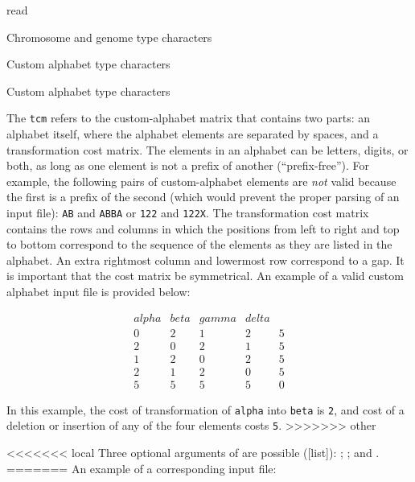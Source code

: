 \begin{command}{read}{}
\begin{arguments}
\begin{argumentgroup}{Chromosome and genome type characters}
\begin{argumentgroup}{Custom alphabet type characters}
\begin{argumentgroup}{Custom alphabet type characters}
{{                \indent The \texttt{tcm} refers to the custom-alphabet matrix
                that contains two parts: an alphabet itself, where the alphabet
                elements are separated by spaces, and a transformation cost
                matrix. The elements in an alphabet can be letters, digits, or
                both, as long as one element is not a prefix of another
                (``prefix-free''). For example, the following pairs of
                custom-alphabet elements are \emph{not} valid because the first
                is a prefix of the second (which would prevent the proper
                parsing of an input file): \texttt{AB} and \texttt{ABBA} or
                \texttt{122} and \texttt{122X}.  The transformation cost matrix
                contains the rows and columns in which the positions from left
                to right and top to bottom correspond to the sequence of the
                elements as they are listed in the alphabet. An extra rightmost
                column and lowermost row correspond to a gap. It is important
                that the cost matrix  be symmetrical. An example of a valid
                custom alphabet input file is provided below:
             
                \begin{equation*}
                    \begin{array}{lllll}
                          alpha & beta & gamma & delta & \\
                        0 &     2 &    1 &     2 &     5 \\
                        2 &     0 &    2 &     1 &     5 \\
                        1 &     2 &    0 &     2 &     5 \\
                        2 &     1 &    2 &     0 &     5 \\
                        5 &     5 &    5 &     5 &     0
                     \end{array}
                \end{equation*} 

                In this example, the cost of transformation of \texttt{alpha}
                into \texttt{beta} is \texttt{2}, and cost of a deletion or
                insertion of any of the four elements costs \texttt{5}.
>>>>>>> other
           
<<<<<<< local
	Three optional arguments of  are possible ([\poylident list]): 
	; ; and .  
=======
                An example of a corresponding input file:
       
}}
\end{argumentgroup}
\end{argumentgroup}
\end{argumentgroup}
\end{arguments}
\end{command}
